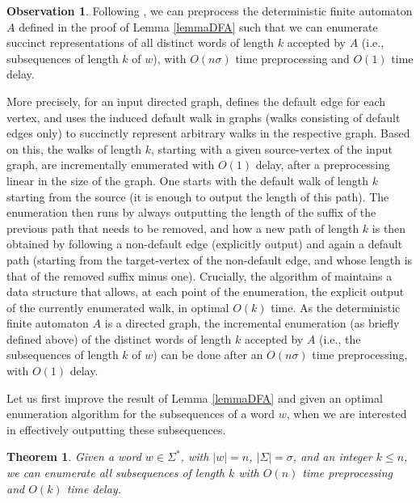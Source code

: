 \documentclass[10pt,a4paper]{amsart}
\theoremstyle{plain}
\newtheorem{theorem}{Theorem}
\theoremstyle{definition}
\newtheorem{observation}{Observation}
\begin{document}
\begin{observation}
Following \cite{AdamsonGM24}, we can preprocess the deterministic finite automaton $A$ defined in the proof of Lemma \ref{lemmaDFA} such that we can enumerate succinct representations of all distinct words of length $k$ accepted by $A$ (i.e., subsequences of length $k$ of $w$), with $O(n \sigma)$ time preprocessing and $O(1)$ time delay. 
\end{observation}

More precisely, for an input directed graph, \cite{AdamsonGM24} defines the default edge for each vertex, and uses the induced default walk in graphs (walks consisting of default edges only) to succinctly represent arbitrary walks in the respective graph. Based on this, the walks of length $k$, starting with a given source-vertex of the input graph, are incrementally enumerated with $O(1)$ delay, after a preprocessing linear in the size of the graph. One starts with the default walk of length $k$ starting from the source (it is enough to output the length of this path). The enumeration then runs by always outputting the length of the suffix of the previous path that needs to be removed, and how a new path of length $k$ is then obtained by following a non-default edge (explicitly output) and again a default path (starting from the target-vertex of the non-default edge, and whose length is that of the removed suffix minus one). Crucially, the algorithm of \cite{AdamsonGM24}  maintains a data structure that allows, at each point of the enumeration, the explicit output of the currently enumerated walk, in optimal $O(k)$ time. As the deterministic finite automaton $A$ is a directed graph, the incremental enumeration (as briefly defined above) of the distinct words of length $k$ accepted by $A$ (i.e., the subsequences of length $k$ of $w$) can be done after an $O(n\sigma)$ time preprocessing, with $O(1)$ delay. 

Let us first improve the result of Lemma \ref{lemmaDFA} and given an optimal enumeration algorithm for the subsequences of a word $w$, when we are interested in effectively outputting these subsequences.
\begin{theorem}\label{lemmaRMQ}
Given a word $w \in \Sigma^*$, with $|w|=n$, $|\Sigma|=\sigma$, and an integer $k \leq n$, we can enumerate all subsequences of length $k$ with $O(n)$ time preprocessing and $O(k)$ time delay.
\end{theorem}
\end{document}
